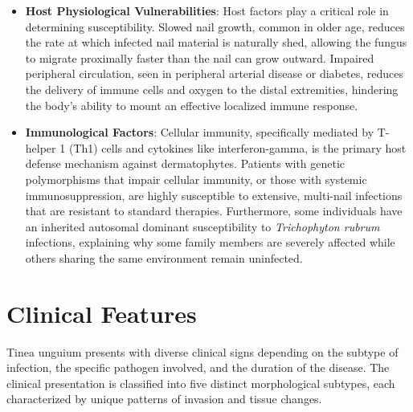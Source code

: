 \begin{itemize}
    \item \textbf{Host Physiological Vulnerabilities}: Host factors play a critical role in determining susceptibility. Slowed nail growth, common in older age, reduces the rate at which infected nail material is naturally shed, allowing the fungus to migrate proximally faster than the nail can grow outward. Impaired peripheral circulation, seen in peripheral arterial disease or diabetes, reduces the delivery of immune cells and oxygen to the distal extremities, hindering the body's ability to mount an effective localized immune response.
    \item \textbf{Immunological Factors}: Cellular immunity, specifically mediated by T-helper 1 (Th1) cells and cytokines like interferon-gamma, is the primary host defense mechanism against dermatophytes. Patients with genetic polymorphisms that impair cellular immunity, or those with systemic immunosuppression, are highly susceptible to extensive, multi-nail infections that are resistant to standard therapies. Furthermore, some individuals have an inherited autosomal dominant susceptibility to \textit{Trichophyton rubrum} infections, explaining why some family members are severely affected while others sharing the same environment remain uninfected.
\end{itemize}

\section*{Clinical Features}
Tinea unguium presents with diverse clinical signs depending on the subtype of infection, the specific pathogen involved, and the duration of the disease. The clinical presentation is classified into five distinct morphological subtypes, each characterized by unique patterns of invasion and tissue changes.


